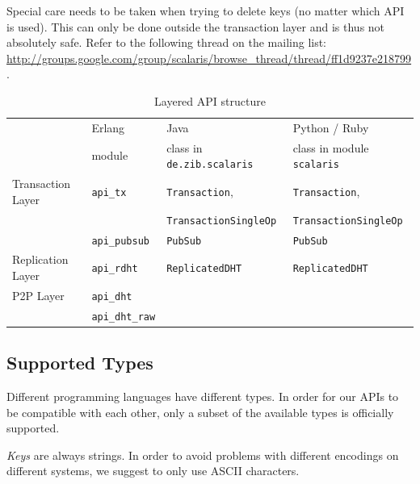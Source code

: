 \documentclass[a4paper]{scrreprt}
\newcommand{\code}[1]{\lstinline[basicstyle=\ttfamily]!#1!}
\begin{document}
Special care needs to be taken when trying to delete keys (no matter which API
is used). This can only be done outside the transaction layer and is thus not
absolutely safe. Refer to the following thread on the mailing list:
\url{http://groups.google.com/group/scalaris/browse_thread/thread/ff1d9237e218799}.

\begin{table}
  \centering
    \begin{tabular}{p{4cm}lll}
    \toprule
                      & Erlang                 & Java                         & Python / Ruby              \\
                      & \footnotesize{module}  & \footnotesize{class in \code{de.zib.scalaris}}%
                                                                              & \footnotesize{class in module \code{scalaris}} \\
    \midrule
    Transaction Layer & \code{api_tx}          & \code{Transaction},          & \code{Transaction},        \\
                      &                        & \code{TransactionSingleOp}   & \code{TransactionSingleOp} \\
                      & \code{api_pubsub}      & \code{PubSub}                & \code{PubSub}              \\
    \cmidrule(lr){1-4}
    Replication Layer & \code{api_rdht}        & \code{ReplicatedDHT}         & \code{ReplicatedDHT}       \\
    \cmidrule(lr){1-4}
    P2P Layer         & \code{api_dht}         &                              &                            \\
                      & \code{api_dht_raw}     &                              &                            \\
    \bottomrule
    \end{tabular}
    \caption{Layered API structure}
    \label{api.layers}
\end{table}

\subsection{Supported Types}

Different programming languages have different types. In order for our APIs
to be compatible with each other, only a subset of the available types is
officially supported.

\emph{Keys} are always strings. In order to avoid problems with different
encodings on different systems, we suggest to only use ASCII characters.
\end{document}
